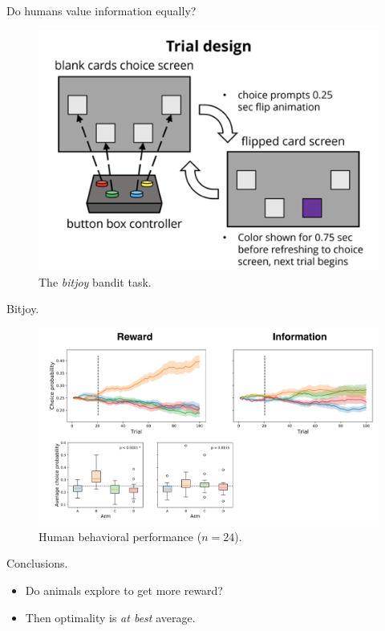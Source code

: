 \documentclass[10pt]{beamer}
\begin{document}
\begin{frame}[fragile]{Do humans value information equally?}
\begin{figure}
    \centering
    \includegraphics[scale=0.4]{images/bitjoy.png}
    \caption{The \textit{bitjoy} bandit task.}
\end{figure}
\end{frame}

\begin{frame}[fragile]{Bitjoy.}
\begin{figure}
    \centering
    \includegraphics[scale=0.3]{images/bitjoy_main_results.png}
    \caption{Human behavioral performance ($n=24$).}
\end{figure}
\end{frame}

\begin{frame}[fragile]{Conclusions.}
\begin{itemize}
    \item Do animals explore to get more reward?
    \item Then optimality is \textit{at best} average.
\end{itemize}
\end{frame}
\end{document}
